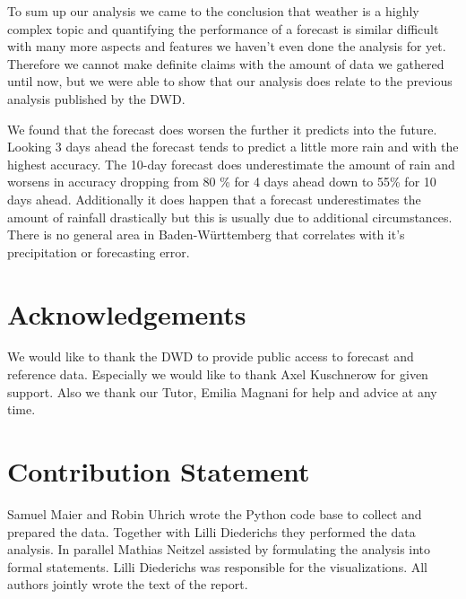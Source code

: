 \documentclass{article}
\theoremstyle{plain}
\theoremstyle{definition}
\theoremstyle{remark}
\begin{document}
To sum up our analysis we came to the conclusion that weather is a highly
complex topic and quantifying the performance of a forecast is similar
difficult with many more aspects and features we haven't even done the analysis
for yet. Therefore we cannot make definite claims with the amount of data we
gathered until now, but we were able to show that our analysis does relate to
the previous analysis published by the DWD. %

We found that the forecast does worsen the further it predicts into the future.
Looking 3 days ahead the forecast tends to predict a little more rain and with
the highest accuracy. The 10-day forecast does underestimate the amount of rain
and worsens in accuracy dropping from 80 \% for 4 days ahead down to 55\% for
10 days ahead. Additionally it does happen that a forecast underestimates the
amount of rainfall drastically but this is usually due to additional
circumstances. There is no general area in Baden-Württemberg that correlates
with it's precipitation or forecasting error.

\section*{Acknowledgements}

We would like to thank the DWD to provide public access to forecast and
reference data. Especially we would like to thank Axel Kuschnerow for given
support. Also we thank our Tutor, Emilia Magnani for help and advice at any
time.

\section*{Contribution Statement}

Samuel Maier and Robin Uhrich wrote the Python code base to collect and
prepared the data. Together with Lilli Diederichs they performed the data
analysis. In parallel Mathias Neitzel assisted by formulating the analysis into
formal statements. Lilli Diederichs was responsible for the visualizations. All
authors jointly wrote the text of the report. \\
\end{document}

